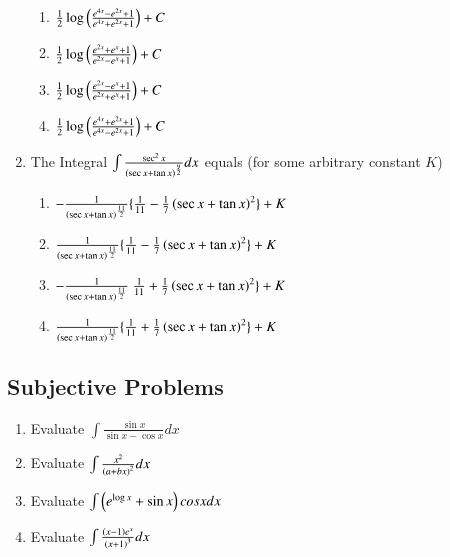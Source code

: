 \documentclass[article,12pt,onecolumn]{IEEEtran}
\theoremstyle{remark}
\begin{document}
\begin{enumerate}
\hfill{}
\begin{multicols}{2}
\begin{enumerate}
    \item $\frac{1}{2}\log\left(\frac{e^{4x}-e^{2x}+1}{e^{4x}+e^{2x}+1}\right) + C$
    \item $\frac{1}{2}\log\left(\frac{e^{2x}+e^{x}+1}{e^{2x}-e^{x}+1}\right) + C$
    \item $\frac{1}{2}\log\left(\frac{e^{2x}-e^{x}+1}{e^{2x}+e^{x}+1}\right) + C$ 
    \item $\frac{1}{2}\log\left(\frac{e^{4x}+e^{2x}+1}{e^{4x}-e^{2x}+1}\right) + C$
\end{enumerate}
\end{multicols}
\item The Integral $\int\frac{\sec^{2}x}{\left(\sec x +\tan x\right)^\frac{9}{2}}dx $  equals (for some arbitrary constant $K$)
\hfill {}
\begin{enumerate}
    \item $-\frac{1}{\left(\sec x + \tan x\right)^{\frac{11}{2}}} \{ \frac{1}{11} - \frac{1}{7}\left(\sec x +\tan x\right)^{2}\} + K$
    \item $\frac{1}{\left(\sec x + \tan x\right)^{\frac{11}{2}}} \{ \frac{1}{11} - \frac{1}{7}\left(\sec x +\tan x\right)^{2}\} + K$
    \item $-\frac{1}{\left(\sec x + \tan x\right)^{\frac{11}{2}}} \ \frac{1}{11} + \frac{1}{7}\left(\sec x +\tan x\right)^{2}\} + K$
    \item  $\frac{1}{\left(\sec x + \tan x\right)^{\frac{11}{2}}} \{ \frac{1}{11} + \frac{1}{7}\left(\sec x +\tan x\right)^{2}\} + K$
\end{enumerate}
\end{enumerate}
\subsection{Subjective Problems}    
\begin{enumerate}
\item Evaluate $\int \frac{\sin x}{\sin x - \cos x}dx $
\hfill{}
\item Evaluate $\int \frac{x^{2}}{\left(a+bx\right)^{2}}dx$
\hfill {}
\item Evaluate $\int \left(e^{\log x} + \sin x\right)cos xdx $
\hfill {}
\item Evaluate $\int \frac{\left(x-1\right)e^{x}}{\left(x+1\right)^{3}} dx$
\hfill {}
\end{enumerate}
\end{document}
